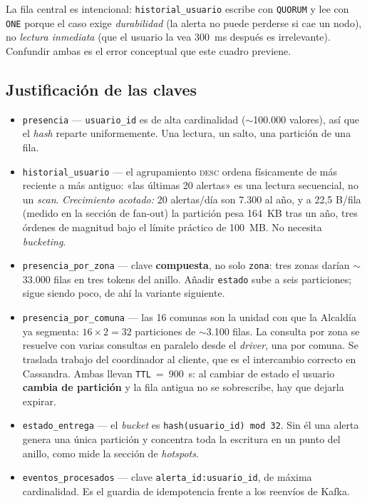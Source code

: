 \documentclass[11pt,a4paper]{article}
\begin{document}
\noindent La fila central es intencional: \texttt{historial\_usuario} escribe con
\texttt{QUORUM} y lee con \texttt{ONE} porque el caso exige \emph{durabilidad} (la
alerta no puede perderse si cae un nodo), no \emph{lectura inmediata} (que el
usuario la vea 300~ms después es irrelevante). Confundir ambas es el error
conceptual que este cuadro previene.

\subsection{Justificación de las claves}
\begin{itemize}[leftmargin=*,itemsep=2pt]
\item \texttt{presencia} — \texttt{usuario\_id} es de alta cardinalidad
($\sim$100.000 valores), así que el \emph{hash} reparte uniformemente. Una lectura,
un salto, una partición de una fila.

\item \texttt{historial\_usuario} — el agrupamiento \textsc{desc} ordena
físicamente de más reciente a más antiguo: «las últimas 20 alertas» es una lectura
secuencial, no un \emph{scan}. \emph{Crecimiento acotado:} 20 alertas/día son 7.300
al año, y a 22,5 B/fila (medido en la sección de fan-out) la partición pesa 164~KB tras un año, tres
órdenes de magnitud bajo el límite práctico de 100~MB. No necesita \emph{bucketing}.

\item \texttt{presencia\_por\_zona} — clave \textbf{compuesta}, no solo
\texttt{zona}: tres zonas darían $\sim$33.000 filas en tres tokens del anillo.
Añadir \texttt{estado} sube a seis particiones; sigue siendo poco, de ahí la
variante siguiente.

\item \texttt{presencia\_por\_comuna} — las 16 comunas son la unidad con que la
Alcaldía ya segmenta: $16\times2=32$ particiones de $\sim$3.100 filas. La consulta
por zona se resuelve con varias consultas en paralelo desde el \emph{driver}, una
por comuna. Se traslada trabajo del coordinador al cliente, que es el intercambio
correcto en Cassandra. Ambas llevan \texttt{TTL}~=~900~s: al cambiar de estado el
usuario \textbf{cambia de partición} y la fila antigua no se sobrescribe, hay que
dejarla expirar.

\item \texttt{estado\_entrega} — el \emph{bucket} es
\texttt{hash(usuario\_id) mod 32}. Sin él una alerta genera una única partición y
concentra toda la escritura en un punto del anillo, como mide la sección de
\emph{hotspots}.

\item \texttt{eventos\_procesados} — clave \texttt{alerta\_id:usuario\_id}, de
máxima cardinalidad. Es el guardia de idempotencia frente a los reenvíos de Kafka.
\end{itemize}
\end{document}
